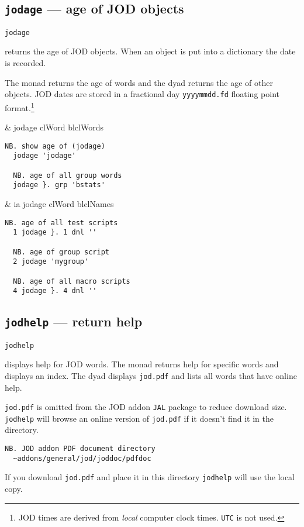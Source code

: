 \subsection{\texttt{jodage} --- age of JOD objects}  

\hypertarget{il:jodage}{\texttt{jodage}} returns the age of JOD objects.  When an object is 
put into a dictionary the date is recorded. 

The monad returns the age of words and the dyad returns the age of other objects.  
JOD dates are stored in a fractional day \verb|yyyymmdd.fd| floating point format.\footnote{
JOD times are derived from \emph{local} computer clock times. \texttt{UTC} is not used.
}    

\begin{wordhead}
\monad & jodage clWord \argsep blclWords \\
\end{wordhead}
\begin{lstlisting}[frame=single,framerule=0pt] 
  NB. show age of (jodage)  
  jodage 'jodage' 

  NB. age of all group words 
  jodage }. grp 'bstats' 
\end{lstlisting}

\begin{wordhead}
\dyad & ia jodage clWord \argsep blclNames \\
\end{wordhead}
\begin{lstlisting}[frame=single,framerule=0pt] 
  NB. age of all test scripts  
  1 jodage }. 1 dnl ''   

  NB. age of group script  
  2 jodage 'mygroup'     

  NB. age of all macro scripts  
  4 jodage }. 4 dnl ''   
\end{lstlisting}


\subsection{\texttt{jodhelp} --- return help}\label{ss:jodhelp}  

\hypertarget{il:jodhelp}{\texttt{jodhelp}} displays help
 for JOD words.  
The monad returns help for specific words and displays an index.  
The dyad displays \verb|jod.pdf| and lists all words that have online help.

\verb|jod.pdf| is omitted from the JOD addon \texttt{JAL} package to
reduce download size. \texttt{jodhelp} will browse an online 
version of \verb|jod.pdf| if it doesn't find it in the directory.
\begin{lstlisting}[frame=single,framerule=0pt]
  NB. JOD addon PDF document directory
  ~addons/general/jod/joddoc/pdfdoc
\end{lstlisting}
If you download \verb|jod.pdf| and place it in this directory
\texttt{jodhelp} will use the local copy.

